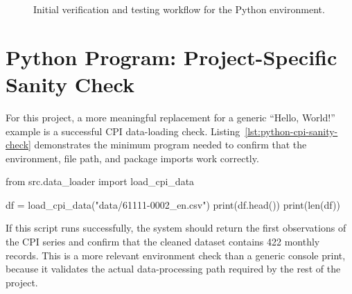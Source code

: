 \begin{figure}[htbp]
	\centering
	\caption{Initial verification and testing workflow for the Python environment.}
	\label{fig:python-first-steps}
\end{figure}

\section{Python Program: Project-Specific Sanity Check}

For this project, a more meaningful replacement for a generic ``Hello, World!'' example is a successful CPI data-loading check. Listing~\ref{lst:python-cpi-sanity-check} demonstrates the minimum program needed to confirm that the environment, file path, and package imports work correctly.

\begin{Python}[caption={Project-specific Python sanity check}, label={lst:python-cpi-sanity-check}]
	from src.data_loader import load_cpi_data
	
	df = load_cpi_data("data/61111-0002_en.csv")
	print(df.head())
	print(len(df))
\end{Python}

If this script runs successfully, the system should return the first observations of the CPI series and confirm that the cleaned dataset contains 422 monthly records. This is a more relevant environment check than a generic console print, because it validates the actual data-processing path required by the rest of the project.
